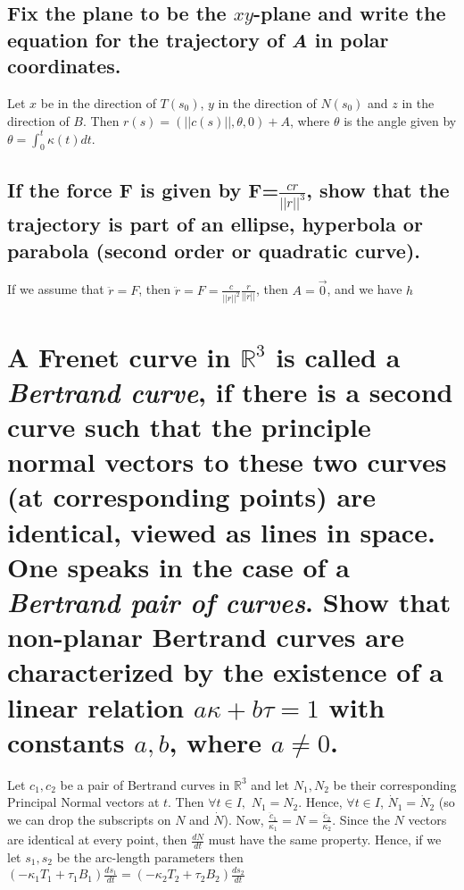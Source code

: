 \documentclass[12pt]{amsart}
\begin{document}
\subsection{Fix the plane to be the $xy$-plane and write the equation for the trajectory of \emph{A} in polar coordinates.}
Let $x$ be in the direction of $T(s_0)$, $y$ in the direction of $N(s_0)$ and $z$ in the direction of $B$. Then $r(s)=(||c(s)||,\theta,0)+A$, where $\theta$ is the angle given by $\theta=\int_0^t\kappa(t)dt$.

\subsection{If the force \textbf{F} is given by \textbf{F}=$\frac{cr}{||r||^3}$, show that the trajectory is part of an ellipse, hyperbola or parabola (second order or quadratic curve).}
If we assume that $\ddot r=F$, then $\ddot r=F=\frac{c}{||r||^2}\frac{r}{||r||}$, then $A=\vec0$, and we have $h$

\setcounter{equation}{0}
\newpage
\section{A Frenet curve in $\mathbb{R}^3$ is called a \emph{Bertrand curve}, if there is a second curve such that the principle normal vectors to these two curves (at corresponding points) are identical, viewed as lines in space. One speaks in the case of a \emph{Bertrand pair of curves}. Show that non-planar Bertrand curves are characterized by the existence of a linear relation $a\kappa+b\tau=1$ with constants $a,b$, where $a\neq0$.} Let $c_1,c_2$ be a pair of Bertrand curves in $\mathbb{R}^3$ and let $N_1,N_2$ be their corresponding Principal Normal vectors at $t$. Then $\forall t\in I,$ $N_1=N_2$. Hence, $\forall t\in I$, $\dot N_1=\dot N_2$ (so we can drop the subscripts on $N$ and $\dot N$). Now, $\frac{\ddot c_1}{\kappa_1}=N=\frac{\ddot c_2}{\kappa_2}$. Since the $N$ vectors are identical at every point, then $\frac{dN}{dt}$ must have the same property. Hence, if we let $s_1,s_2$ be the arc-length parameters then $(-\kappa_1T_1+\tau_1B_1)\frac{ds_1}{dt}=(-\kappa_2T_2+\tau_2B_2)\frac{ds_2}{dt}$
\begin{comment}Since,
\[\left(\begin{array}{c}
	T_1 \\
	N_1 \\
	B_1
\end{array} \right)' =\left(\begin{array}{ccc}
	0 & \kappa_1 & 0 \\
	-\kappa_1 & 0 & \tau_1 \\
	0 & -\tau_1 & 0
\end{array} \right)
\left(\begin{array}{c}
	T_1\\
	N_1\\
	B_1
\end{array}\right) \]
we know, $-\kappa_1T_1+\tau_1B_1=-\kappa_2T_2+\tau_2B_2$, and $\frac{T_1'}{\kappa_1}=\frac{T_2'}{\kappa_2}$
\end{comment}
\end{document}
